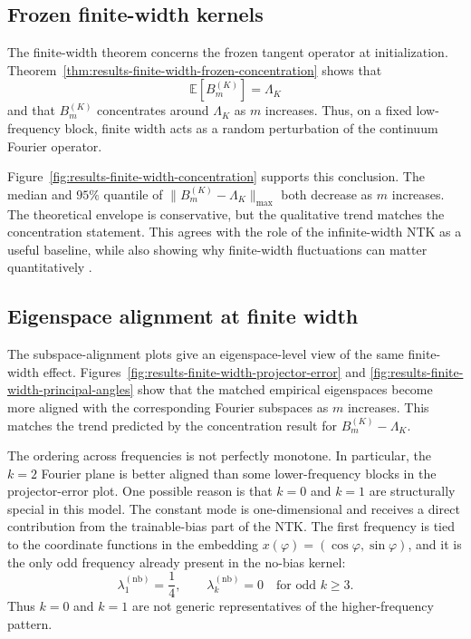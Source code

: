 \subsection{Frozen finite-width kernels}
\label{subsec:discussion-finite-width-frozen}

The finite-width theorem concerns the frozen tangent operator at initialization.
Theorem~\ref{thm:results-finite-width-frozen-concentration} shows that
\[
	\mathbb E[B_m^{(K)}]=\Lambda_K
\]
and that \(B_m^{(K)}\) concentrates around \(\Lambda_K\) as \(m\) increases.
Thus, on a fixed low-frequency block, finite width acts as a random perturbation
of the continuum Fourier operator.

Figure~\ref{fig:results-finite-width-concentration} supports this conclusion.
The median and \(95\%\) quantile of
\(\|B_m^{(K)}-\Lambda_K\|_{\max}\) both decrease as \(m\) increases. The
theoretical envelope is conservative, but the qualitative trend matches the
concentration statement. This agrees with the role of the infinite-width NTK as
a useful baseline, while also showing why finite-width fluctuations can matter
quantitatively
\citep{jacot2018ntk,lee2020wide,bordelon2023dynamicsfinitewidthkernel,vyas2022limitationsntkunderstandinggeneralization}.

\subsection{Eigenspace alignment at finite width}
\label{subsec:discussion-finite-width-alignment}

The subspace-alignment plots give an eigenspace-level view of the same
finite-width effect. Figures~\ref{fig:results-finite-width-projector-error} and
\ref{fig:results-finite-width-principal-angles} show that the matched empirical
eigenspaces become more aligned with the corresponding Fourier subspaces as
\(m\) increases. This matches the trend predicted by the concentration result for
\(B_m^{(K)}-\Lambda_K\).

The ordering across frequencies is not perfectly monotone. In particular, the
\(k=2\) Fourier plane is better aligned than some lower-frequency blocks in the
projector-error plot. One possible reason is that \(k=0\) and \(k=1\) are
structurally special in this model. The constant mode is one-dimensional and
receives a direct contribution from the trainable-bias part of the NTK. The
first frequency is tied to the coordinate functions in the embedding
\(x(\varphi)=(\cos\varphi,\sin\varphi)\), and it is the only odd frequency
already present in the no-bias kernel:
\[
	\lambda_1^{(\mathrm{nb})}=\frac14,
	\qquad
	\lambda_k^{(\mathrm{nb})}=0
	\quad \text{for odd } k\ge 3.
\]
Thus \(k=0\) and \(k=1\) are not generic representatives of the
higher-frequency pattern.

